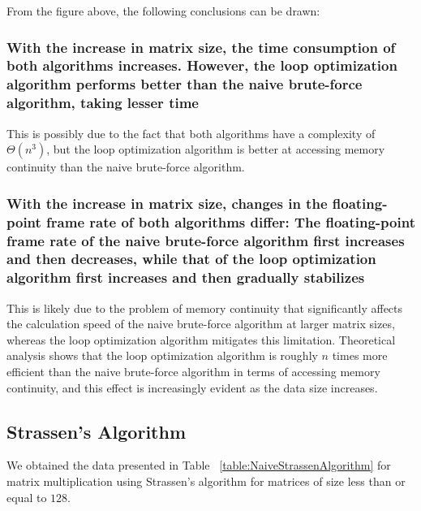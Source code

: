 \documentclass[conference]{IEEEtran}
\begin{document}
	From the figure above, the following conclusions can be drawn:
	
	\subsubsection{With the increase in matrix size, the time consumption of both algorithms increases. However, the loop optimization algorithm performs better than the naive brute-force algorithm, taking lesser time} This is possibly due to the fact that both algorithms have a complexity of $\Theta(n^3)$, but the loop optimization algorithm is better at accessing memory continuity than the naive brute-force algorithm.
	
	\subsubsection{	With the increase in matrix size, changes in the floating-point frame rate of both algorithms differ:
		The floating-point frame rate of the naive brute-force algorithm first increases and then decreases, while that of the loop optimization algorithm first increases and then gradually stabilizes} This is likely due to the problem of memory continuity that significantly affects the calculation speed of the naive brute-force algorithm at larger matrix sizes, whereas the loop optimization algorithm mitigates this limitation. Theoretical analysis shows that the loop optimization algorithm is roughly $n$ times more efficient than the naive brute-force algorithm in terms of accessing memory continuity, and this effect is increasingly evident as the data size increases.
	
	\subsection{Strassen's Algorithm}
	We obtained the data presented in Table ~\ref{table:NaiveStrassenAlgorithm} for matrix multiplication using Strassen's algorithm for matrices of size less than or equal to $128$.
	
\end{document}
